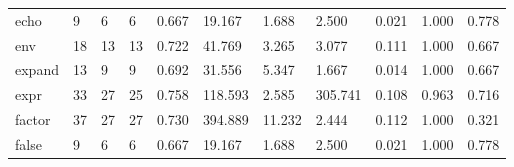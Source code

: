 \begin{longtable}{lp{1.8cm}p{1.8cm}p{1.8cm}p{1.8cm}p{1.8cm}p{1.8cm}p{1.8cm}p{1.8cm}p{1.8cm}p{1.8cm}}
echo      &                            9 &                  6 &                                 6 &                                      0.667 &                                 19.167 &                                        1.688 &                             2.500 &                                   0.021 &                              1.000 &                                              0.778 \\
env       &                           18 &                 13 &                                13 &                                      0.722 &                                 41.769 &                                        3.265 &                             3.077 &                                   0.111 &                              1.000 &                                              0.667 \\
expand    &                           13 &                  9 &                                 9 &                                      0.692 &                                 31.556 &                                        5.347 &                             1.667 &                                   0.014 &                              1.000 &                                              0.667 \\
expr      &                           33 &                 27 &                                25 &                                      0.758 &                                118.593 &                                        2.585 &                           305.741 &                                   0.108 &                              0.963 &                                              0.716 \\
factor    &                           37 &                 27 &                                27 &                                      0.730 &                                394.889 &                                       11.232 &                             2.444 &                                   0.112 &                              1.000 &                                              0.321 \\
false     &                            9 &                  6 &                                 6 &                                      0.667 &                                 19.167 &                                        1.688 &                             2.500 &                                   0.021 &                              1.000 &                                              0.778 \\

\end{longtable}
